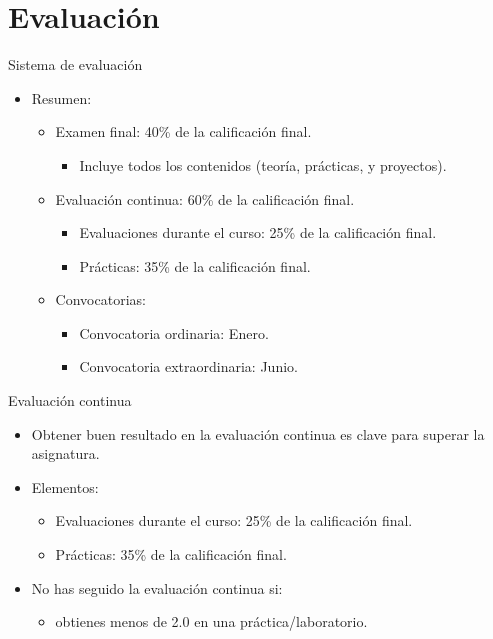 \section{Evaluación}

\begin{frame}[t]{Sistema de evaluación}
\begin{itemize}
  \item Resumen:
  \vspace{1em}
    \begin{itemize}
      \item Examen final: 40\% de la calificación final.
        \begin{itemize}
          \item Incluye todos los contenidos (teoría, prácticas, y proyectos).
        \end{itemize}

      \item Evaluación continua: 60\% de la calificación final.
        \begin{itemize}
          \item Evaluaciones durante el curso: 25\% de la calificación final.
          \item Prácticas: 35\% de la calificación final.
        \end{itemize}
    \end{itemize}
  \vspace{1em}
  \begin{itemize}
    \item Convocatorias:
      \begin{itemize}
        \item Convocatoria ordinaria: Enero.
        \item Convocatoria extraordinaria: Junio.
      \end{itemize}
  \end{itemize}
\end{itemize}
\end{frame}

\begin{frame}[t]{Evaluación continua}
\begin{itemize}
  \item Obtener buen resultado en la evaluación continua es \alert{clave} para superar 
        la asignatura.
  \vspace{1em}
  \item Elementos:
    \begin{itemize}
      \item Evaluaciones durante el curso: 25\% de la calificación final.
      \item Prácticas: 35\% de la calificación final.
    \end{itemize}
  \vspace{1em}
  \item No has seguido la evaluación continua si:
    \begin{itemize}
      \item obtienes menos de 2.0 en una práctica/laboratorio.
    \end{itemize}
\end{itemize}
\end{frame}

